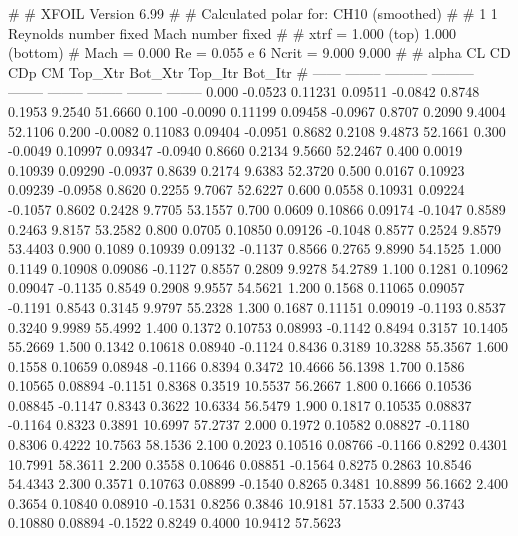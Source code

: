 #  
#       XFOIL         Version 6.99
#  
# Calculated polar for: CH10 (smoothed)                                 
#  
# 1 1 Reynolds number fixed          Mach number fixed         
#  
# xtrf =   1.000 (top)        1.000 (bottom)  
# Mach =   0.000     Re =     0.055 e 6     Ncrit =   9.000  9.000
#  
#   alpha    CL        CD       CDp       CM     Top_Xtr  Bot_Xtr  Top_Itr  Bot_Itr
#  ------ -------- --------- --------- -------- -------- -------- -------- --------
   0.000  -0.0523   0.11231   0.09511  -0.0842   0.8748   0.1953   9.2540  51.6660
   0.100  -0.0090   0.11199   0.09458  -0.0967   0.8707   0.2090   9.4004  52.1106
   0.200  -0.0082   0.11083   0.09404  -0.0951   0.8682   0.2108   9.4873  52.1661
   0.300  -0.0049   0.10997   0.09347  -0.0940   0.8660   0.2134   9.5660  52.2467
   0.400   0.0019   0.10939   0.09290  -0.0937   0.8639   0.2174   9.6383  52.3720
   0.500   0.0167   0.10923   0.09239  -0.0958   0.8620   0.2255   9.7067  52.6227
   0.600   0.0558   0.10931   0.09224  -0.1057   0.8602   0.2428   9.7705  53.1557
   0.700   0.0609   0.10866   0.09174  -0.1047   0.8589   0.2463   9.8157  53.2582
   0.800   0.0705   0.10850   0.09126  -0.1048   0.8577   0.2524   9.8579  53.4403
   0.900   0.1089   0.10939   0.09132  -0.1137   0.8566   0.2765   9.8990  54.1525
   1.000   0.1149   0.10908   0.09086  -0.1127   0.8557   0.2809   9.9278  54.2789
   1.100   0.1281   0.10962   0.09047  -0.1135   0.8549   0.2908   9.9557  54.5621
   1.200   0.1568   0.11065   0.09057  -0.1191   0.8543   0.3145   9.9797  55.2328
   1.300   0.1687   0.11151   0.09019  -0.1193   0.8537   0.3240   9.9989  55.4992
   1.400   0.1372   0.10753   0.08993  -0.1142   0.8494   0.3157  10.1405  55.2669
   1.500   0.1342   0.10618   0.08940  -0.1124   0.8436   0.3189  10.3288  55.3567
   1.600   0.1558   0.10659   0.08948  -0.1166   0.8394   0.3472  10.4666  56.1398
   1.700   0.1586   0.10565   0.08894  -0.1151   0.8368   0.3519  10.5537  56.2667
   1.800   0.1666   0.10536   0.08845  -0.1147   0.8343   0.3622  10.6334  56.5479
   1.900   0.1817   0.10535   0.08837  -0.1164   0.8323   0.3891  10.6997  57.2737
   2.000   0.1972   0.10582   0.08827  -0.1180   0.8306   0.4222  10.7563  58.1536
   2.100   0.2023   0.10516   0.08766  -0.1166   0.8292   0.4301  10.7991  58.3611
   2.200   0.3558   0.10646   0.08851  -0.1564   0.8275   0.2863  10.8546  54.4343
   2.300   0.3571   0.10763   0.08899  -0.1540   0.8265   0.3481  10.8899  56.1662
   2.400   0.3654   0.10840   0.08910  -0.1531   0.8256   0.3846  10.9181  57.1533
   2.500   0.3743   0.10880   0.08894  -0.1522   0.8249   0.4000  10.9412  57.5623
